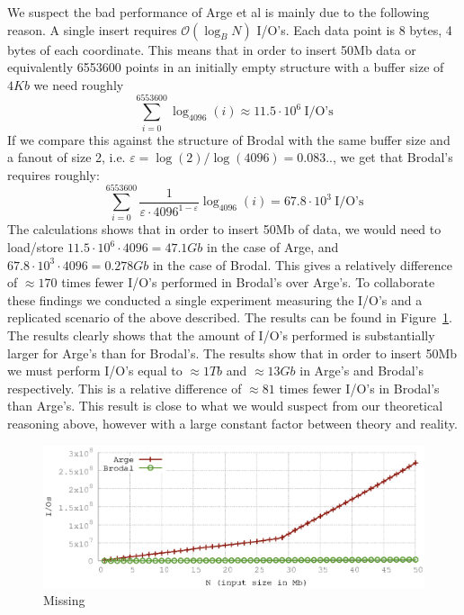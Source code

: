 \documentclass[twoside,11pt,openright]{report}
\def \epsilon {\varepsilon}
\begin{document}
We suspect the bad performance of Arge et al is mainly due to the following reason. A single insert requires $\mathcal{O}(\log_B N)$ I/O's. Each data point is 8 bytes, 4 bytes of each coordinate. This means that in order to insert 50Mb data or equivalently 6553600 points in an initially empty structure with a buffer size of $4Kb$ we need roughly $$\sum\limits_{i=0}^{6553600} \log_{4096}(i) \approx 11.5 \cdot 10^6~\text{I/O's}$$
If we compare this against the structure of Brodal with the same buffer size and a fanout of size 2, i.e. $\epsilon = \log(2)/\log(4096) = 0.083..$, we get that Brodal's requires roughly:
$$\sum\limits_{i=0}^{6553600} \frac{1}{\epsilon \cdot 4096^{1-\epsilon}} \log_{4096}(i) = 67.8\cdot 10^3~\text{I/O's}$$
The calculations shows that in order to insert 50Mb of data, we would need to load/store $11.5 \cdot 10^6 \cdot 4096 = 47.1Gb$ in the case of Arge, and $67.8\cdot 10^3 \cdot 4096 = 0.278Gb$ in the case of Brodal. This gives a relatively difference of $\approx 170$ times fewer I/O's performed in Brodal's over Arge's.
To collaborate these findings we conducted a single experiment measuring the I/O's and a replicated scenario of the above described. The results can be found in Figure~\ref{fig:arge_brodal_ios}. The results clearly shows that the amount of I/O's performed is substantially larger for Arge's than for Brodal's. The results show that in order to insert 50Mb we must perform I/O's equal to $\approx 1Tb$ and $\approx 13Gb$ in Arge's and Brodal's respectively. This is a relative difference of $\approx 81$ times fewer I/O's in Brodal's than Arge's. This result is close to what we would suspect from our theoretical reasoning above, however with a large constant factor between theory and reality.

\begin{figure}[h]
\centering
\includegraphics[width=\textwidth]{../src/experiments/insert_experiment_results/2016-05-21.14_06_50/ios}
\caption{Missing}
\label{fig:arge_brodal_ios}
\end{figure}
\end{document}
